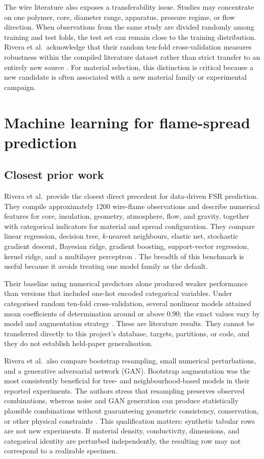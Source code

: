 The wire literature also exposes a transferability issue. Studies may concentrate on one polymer, core, diameter range, apparatus, pressure regime, or flow direction. When observations from the same study are divided randomly among training and test folds, the test set can remain close to the training distribution. Rivera et al.\ acknowledge that their random ten-fold cross-validation measures robustness within the compiled literature dataset rather than strict transfer to an entirely new source \cite{riveraWireML}. For material selection, this distinction is critical because a new candidate is often associated with a new material family or experimental campaign.

\section{Machine learning for flame-spread prediction}

\subsection{Closest prior work}

Rivera et al.\ provide the closest direct precedent for data-driven FSR prediction. They compile approximately \(1200\) wire-flame observations and describe numerical features for core, insulation, geometry, atmosphere, flow, and gravity, together with categorical indicators for material and spread configuration. They compare linear regression, decision tree, \(k\)-nearest neighbours, elastic net, stochastic gradient descent, Bayesian ridge, gradient boosting, support-vector regression, kernel ridge, and a multilayer perceptron \cite{riveraWireML}. The breadth of this benchmark is useful because it avoids treating one model family as the default.

Their baseline using numerical predictors alone produced weaker performance than versions that included one-hot encoded categorical variables. Under categorised random ten-fold cross-validation, several nonlinear models attained mean coefficients of determination around or above \(0.90\); the exact values vary by model and augmentation strategy \cite{riveraWireML}. These are literature results. They cannot be transferred directly to this project's database, targets, partitions, or code, and they do not establish held-paper generalisation.

Rivera et al.\ also compare bootstrap resampling, small numerical perturbations, and a generative adversarial network (GAN). Bootstrap augmentation was the most consistently beneficial for tree- and neighbourhood-based models in their reported experiments. The authors stress that resampling preserves observed combinations, whereas noise and GAN generation can produce statistically plausible combinations without guaranteeing geometric consistency, conservation, or other physical constraints \cite{riveraWireML}. This qualification matters: synthetic tabular rows are not new experiments. If material density, conductivity, dimensions, and categorical identity are perturbed independently, the resulting row may not correspond to a realizable specimen.

